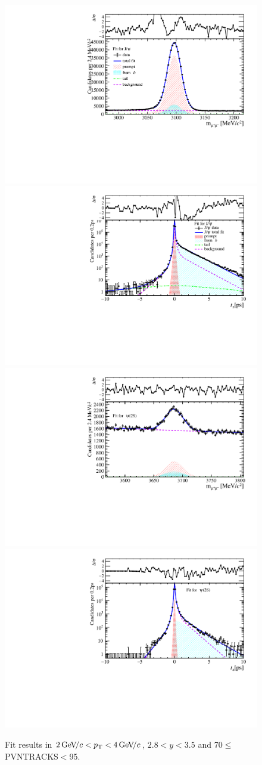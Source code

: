\begin{figure}[H]
\begin{center}
\includegraphics[width=0.47\linewidth]{pdf/Jpsi/drawmass/n4y2pt2.pdf}
\includegraphics[width=0.47\linewidth]{pdf/Jpsi/2DFit/n4y2pt2.pdf}
\vspace*{-0.5cm}
\includegraphics[width=0.47\linewidth]{pdf/Psi2S/drawmass/n4y2pt2.pdf}
\includegraphics[width=0.47\linewidth]{pdf/Psi2S/2DFit/n4y2pt2.pdf}
\vspace*{-0.5cm}
\end{center}
\caption{Fit results in $2\text{\,Ge\kern -0.1em V\!/}c<p_{\mathrm{T}}<4\text{\,Ge\kern -0.1em V\!/}c$, $2.8<y<3.5$ and 70$\leq$PVNTRACKS$<$95.}
\label{Fitn4y2pt2}
\end{figure}
